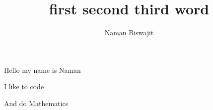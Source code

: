 \documentclass{article}
\title{first second third word }
\author{Naman Biswajit }
\begin{document}
\makehead


 

Hello my name is Naman 
 

I like to code 
 

And do Mathematics 
\end{document}
